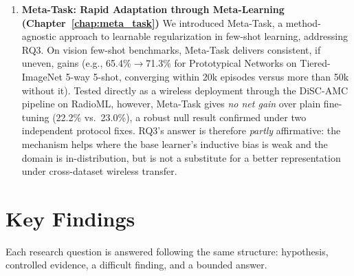 \begin{enumerate}
    \item \textbf{Meta-Task: Rapid Adaptation through Meta-Learning (Chapter~\ref{chap:meta_task})}
    We introduced Meta-Task, a method-agnostic approach to learnable regularization in few-shot learning, addressing RQ3. On vision few-shot benchmarks, Meta-Task delivers consistent, if uneven, gains (e.g., 65.4\%$\to$71.3\% for Prototypical Networks on Tiered-ImageNet 5-way 5-shot, converging within 20k episodes versus more than 50k without it). Tested directly as a wireless deployment through the DiSC-AMC pipeline on RadioML, however, Meta-Task gives \emph{no net gain} over plain fine-tuning (22.2\% vs.\ 23.0\%), a robust null result confirmed under two independent protocol fixes. RQ3's answer is therefore \emph{partly} affirmative: the mechanism helps where the base learner's inductive bias is weak and the domain is in-distribution, but is not a substitute for a better representation under cross-dataset wireless transfer.
\end{enumerate}

\section{Key Findings}
Each research question is answered following the same structure: hypothesis, controlled evidence, a difficult finding, and a bounded answer.

